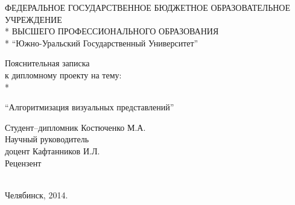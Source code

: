 \begin{titlepage}
\newpage

\begin{center}
  ФЕДЕРАЛЬНОЕ ГОСУДАРСТВЕННОЕ БЮДЖЕТНОЕ ОБРАЗОВАТЕЛЬНОЕ УЧРЕЖДЕНИЕ \\*
  ВЫСШЕГО ПРОФЕССИОНАЛЬНОГО ОБРАЗОВАНИЯ \\*
  ``Южно-Уральский Государственный Университет''
\end{center}

\vspace{8em}

\begin{center}
  \large Пояснительная записка \\ к дипломному проекту на тему: \\*
\end{center}

\vspace{2.5em}

\begin{center}
  \large ``Алгоритмизация визуальных представлений''
\end{center}

\vspace{6em}

\begin{flushleft}
  Студент--дипломник \hrulefill Костюченко М.А. \\
  \vspace{1.5em}
  Научный руководитель \\
  доцент \hrulefill Кафтанников И.Л. \\
  \vspace{1.5em}
  Рецензент \\
  \\
  \vspace{1.5em}
\end{flushleft}

\vspace{\fill}

\begin{center}
  Челябинск, 2014.
\end{center}

\end{titlepage}
